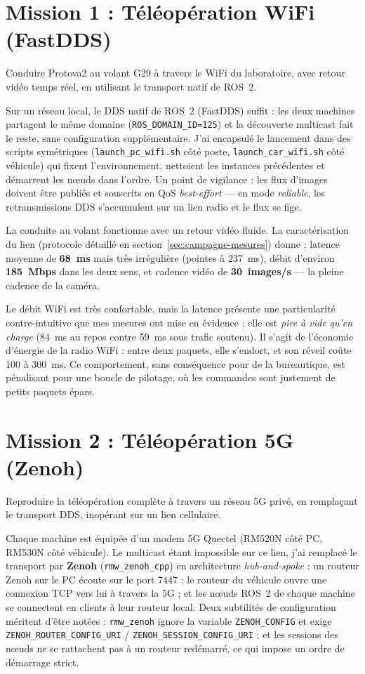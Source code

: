 \section{Mission 1 : Téléopération WiFi (FastDDS)}

\objectif
Conduire Protova2 au volant G29 à travers le WiFi du laboratoire, avec retour
vidéo temps réel, en utilisant le transport natif de ROS~2.

\methodes
Sur un réseau local, le DDS natif de ROS~2 (FastDDS) suffit : les deux
machines partagent le même domaine (\texttt{ROS\_DOMAIN\_ID=125}) et la
découverte multicast fait le reste, sans configuration supplémentaire. J'ai
encapsulé le lancement dans des scripts symétriques
(\texttt{launch\_pc\_wifi.sh} côté poste, \texttt{launch\_car\_wifi.sh} côté
véhicule) qui fixent l'environnement, nettoient les instances précédentes et
démarrent les nœuds dans l'ordre. Un point de vigilance : les flux d'images
doivent être publiés et souscrits en QoS \emph{best-effort} --- en mode
\emph{reliable}, les retransmissions DDS s'accumulent sur un lien radio et le
flux se fige.

\resultats
La conduite au volant fonctionne avec un retour vidéo fluide. La
caractérisation du lien (protocole détaillé en
section~\ref{sec:campagne-mesures}) donne : latence moyenne de \textbf{68~ms}
mais très irrégulière (pointes à 237~ms), débit d'environ \textbf{185~Mbps}
dans les deux sens, et cadence vidéo de \textbf{30~images/s} --- la pleine
cadence de la caméra.

\discussion
Le débit WiFi est très confortable, mais la latence présente une particularité
contre-intuitive que mes mesures ont mise en évidence : elle est \emph{pire à
vide qu'en charge} (84~ms au repos contre 59~ms sous trafic soutenu). Il
s'agit de l'économie d'énergie de la radio WiFi : entre deux paquets, elle
s'endort, et son réveil coûte 100 à 300~ms. Ce comportement, sans conséquence
pour de la bureautique, est pénalisant pour une boucle de pilotage, où les
commandes sont justement de petits paquets épars.

\section{Mission 2 : Téléopération 5G (Zenoh)}

\objectif
Reproduire la téléopération complète à travers un réseau 5G privé, en
remplaçant le transport DDS, inopérant sur un lien cellulaire.

\methodes
Chaque machine est équipée d'un modem 5G Quectel (RM520N côté PC, RM530N côté
véhicule). Le multicast étant impossible sur ce lien, j'ai remplacé le
transport par \textbf{Zenoh} (\texttt{rmw\_zenoh\_cpp}) en architecture
\emph{hub-and-spoke} : un routeur Zenoh sur le PC écoute sur le port 7447 ; le
routeur du véhicule ouvre une connexion TCP vers lui à travers la 5G ; et les
nœuds ROS~2 de chaque machine se connectent en clients à leur routeur local.
Deux subtilités de configuration méritent d'être notées : \texttt{rmw\_zenoh}
ignore la variable \texttt{ZENOH\_CONFIG} et exige
\texttt{ZENOH\_ROUTER\_CONFIG\_URI} / \texttt{ZENOH\_SESSION\_CONFIG\_URI} ;
et les sessions des nœuds ne se rattachent pas à un routeur redémarré, ce qui
impose un ordre de démarrage strict.

